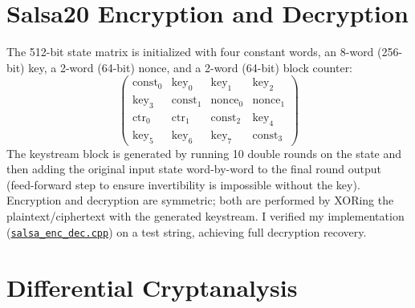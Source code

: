 \documentclass{article}
\begin{document}
\section{Salsa20 Encryption and Decryption}
The 512-bit state matrix is initialized with four constant words, an 8-word (256-bit) key, a 2-word (64-bit) nonce, and a 2-word (64-bit) block counter:
\[
\begin{pmatrix}
    \text{const}_0 & \text{key}_0 & \text{key}_1 & \text{key}_2 \\
    \text{key}_3 & \text{const}_1 & \text{nonce}_0 & \text{nonce}_1 \\
    \text{ctr}_0 & \text{ctr}_1 & \text{const}_2 & \text{key}_4 \\
    \text{key}_5 & \text{key}_6 & \text{key}_7 & \text{const}_3
\end{pmatrix}
\]
The keystream block is generated by running 10 double rounds on the state and then adding the original input state word-by-word to the final round output (feed-forward step to ensure invertibility is impossible without the key).
Encryption and decryption are symmetric; both are performed by XORing the plaintext/ciphertext with the generated keystream. I verified my implementation (\href{file:///home/scorzion/Tech/Crypto/SKC_IITH/Day6/solutions/salsa_enc_dec.cpp}{\texttt{salsa\_enc\_dec.cpp}}) on a test string, achieving full decryption recovery.

\section{Differential Cryptanalysis}
\end{document}
